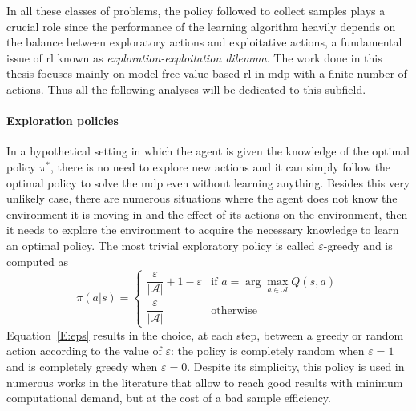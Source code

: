 In all these classes of problems, the policy followed to collect samples plays a crucial role since the performance of the learning algorithm heavily depends on the balance between exploratory actions and exploitative actions, a fundamental issue of \gls{rl} known as \textit{exploration-exploitation dilemma}. The work done in this thesis focuses mainly on model-free value-based \gls{rl} in \gls{mdp} with a finite number of actions. Thus all the following analyses will be dedicated to this subfield.

\paragraph{Exploration policies}
In a hypothetical setting in which the agent is given the knowledge of the optimal policy $\pi^*$, there is no need to explore new actions and it can simply follow the optimal policy to solve the \gls{mdp} even without learning anything. Besides this very unlikely case, there are numerous situations where the agent does not know the environment it is moving in and the effect of its actions on the environment, then it needs to explore the environment to acquire the necessary knowledge to learn an optimal policy. The most trivial exploratory policy is called $\varepsilon$-greedy and is computed as
\begin{equation}\label{E:eps}
\pi(a|s)=
    \begin{cases}
    \dfrac{\varepsilon}{|\mathcal{A}|} + 1 - \varepsilon & \text{if } a = \arg\max_{a \in \mathcal{A}}Q(s,a)\\
    \dfrac{\varepsilon}{|\mathcal{A}|} & \text{otherwise}
    \end{cases}
\end{equation}
Equation~\ref{E:eps} results in the choice, at each step, between a greedy or random action according to the value of $\varepsilon$: the policy is completely random when $\varepsilon = 1$ and is completely greedy when $\varepsilon = 0$.
Despite its simplicity, this policy is used in numerous works in the literature that allow to reach good results with minimum computational demand, but at the cost of a bad sample efficiency.

